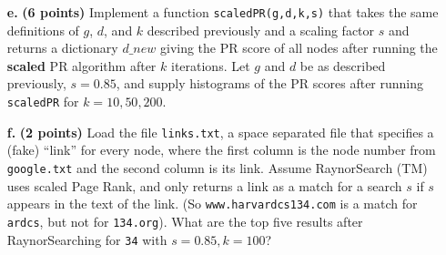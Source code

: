 \documentclass[11pt]{article}
\newcommand{\code}[1]{\texttt{#1}}
\begin{document}
\begin{itemize}
    \item[\textbf{e. }] \textbf{(6 points)} Implement a function \code{scaledPR(g,d,k,s)} that takes the same definitions of $g$, $d$, and $k$ described previously and a scaling factor $s$ and returns a dictionary $d\_new$ giving the PR score of all nodes after running the \textbf{scaled} PR algorithm after $k$ iterations. Let $g$ and $d$ be as described previously, $s = 0.85$, and supply histograms of the PR scores after running \code{scaledPR} for $k = 10, 50, 200$.
    \item[\textbf{f. }] \textbf{(2 points)} Load the file \code{links.txt}, a space separated file that specifies a (fake) ``link'' for every node, where the first column is the node number from \code{google.txt} and the second column is its link. Assume RaynorSearch (TM) uses scaled Page Rank, and only returns a link as a match for a search $s$ if $s$ appears in the text of the link. (So \code{www.harvardcs134.com} is a match for \code{ardcs}, but not for \code{134.org}). What are the top five results after RaynorSearching for \code{34} with $s=0.85, k=100$?

\end{itemize}
\end{document}
